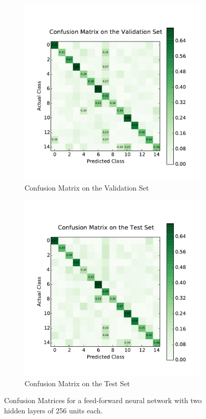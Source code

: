\begin{figure}
	\centering
	\begin{subfigure}[b]{0.45\linewidth}
		\centering
		\includegraphics[width=\linewidth]{images/0/cm_valid.pdf}
		\caption{Confusion Matrix on the Validation Set}
	\end{subfigure}
	\hfill
	\begin{subfigure}[b]{0.45\linewidth}
		\centering
		\includegraphics[width=\linewidth]{images/0/cm_test.pdf}
		\caption{Confusion Matrix on the Test Set}
	\end{subfigure}
	\caption{Confusion Matrices for a feed-forward neural network with two hidden layers of 256 units each.}
	\label{shrine0_mat}
\end{figure}
